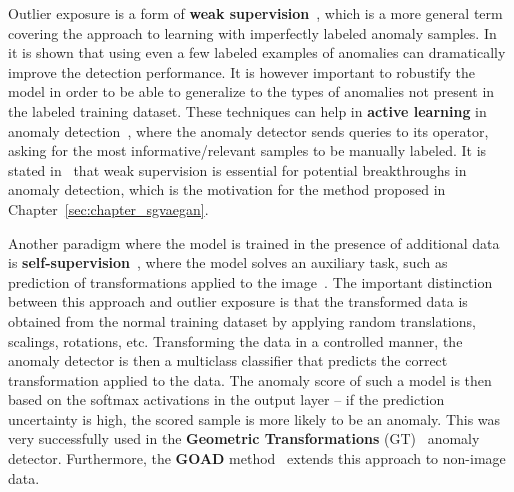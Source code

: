 Outlier exposure is a form of \textbf{weak supervision}~\cite{zhou2018brief}, which is a more general term covering the approach to learning with imperfectly labeled anomaly samples. In~\cite{ruff2019deep,liznerski2020explainable} it is shown that using even a few labeled examples of anomalies can dramatically improve the detection performance. It is however important to robustify the model in order to be able to generalize to the types of anomalies not present in the labeled training dataset. These techniques can help in \textbf{active learning} in anomaly detection~\cite{abe2006outlier}, where the anomaly detector sends queries to its operator, asking for the most informative/relevant samples to be manually labeled. It is stated in~\cite{ruff2020unifying} that weak supervision is essential for potential breakthroughs in anomaly detection, which is the motivation for the method proposed in Chapter~\ref{sec:chapter_sgvaegan}.

Another paradigm where the model is trained in the presence of additional data is \textbf{self-supervision}~\cite{kolesnikov2019revisiting}, where the model solves an auxiliary task, such as prediction of transformations applied to the image~\cite{chen2020simple}. The important distinction between this approach and outlier exposure is that the transformed data is obtained from the normal training dataset by applying random translations, scalings, rotations, etc. Transforming the data in a controlled manner, the anomaly detector is then a multiclass classifier that predicts the correct transformation applied to the data. The anomaly score of such a model is then based on the softmax activations in the output layer -- if the prediction uncertainty is high, the scored sample is more likely to be an anomaly. This was very successfully used in the \textbf{Geometric Transformations} (GT)~\cite{golan2018deep} anomaly detector. Furthermore, the \textbf{GOAD} method~\cite{bergman2020classification} extends this approach to non-image data.

